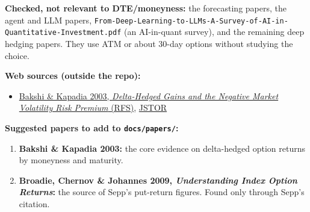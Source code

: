 \documentclass{article}
\begin{document}
\textbf{Checked, not relevant to DTE/\allowbreak{}moneyness:} the forecasting papers, the agent and LLM papers, \texttt{From-\allowbreak{}Deep-\allowbreak{}Learning-\allowbreak{}to-\allowbreak{}LLMs-\allowbreak{}A-\allowbreak{}Survey-\allowbreak{}of-\allowbreak{}AI-\allowbreak{}in-\allowbreak{}Quantitative-\allowbreak{}Investment.\allowbreak{}pdf} (an AI-in-quant survey), and the remaining deep hedging papers. They use ATM or about 30-day options without studying the choice.

\textbf{Web sources (outside the repo):}

\begin{itemize}

\item \href{https://people.umass.edu/~nkapadia/docs/Bakshi_and_Kapadia_2003_RFS.pdf}{Bakshi \& Kapadia 2003, \emph{Delta-Hedged Gains and the Negative Market Volatility Risk Premium} (RFS)}, \href{https://www.jstor.org/stable/1262684}{JSTOR}

\end{itemize}

\textbf{Suggested papers to add to \texttt{docs/\allowbreak{}papers/\allowbreak{}}:}

\begin{enumerate}

\item \textbf{Bakshi \& Kapadia 2003:} the core evidence on delta-hedged option returns by moneyness and maturity.

\item \textbf{Broadie, Chernov \& Johannes 2009, \emph{Understanding Index Option Returns}:} the source of Sepp's put-return figures. Found only through Sepp's citation.

\end{enumerate}
\end{document}
